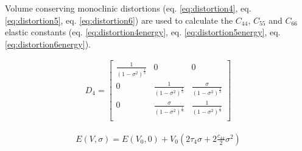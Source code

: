 Volume conserving monoclinic distortions (eq. \ref{eq:distortion4}, eq. \ref{eq:distortion5}, eq. \ref{eq:distortion6}) are used to calculate the $C_{44}$, $C_{55}$ and $C_{66}$ elastic constants (eq. \ref{eq:distortion4energy}, eq. \ref{eq:distortion5energy}, eq. \ref{eq:distortion6energy}).



\begin{center}
\begin{minipage}{.35\textwidth}
  \begin{equation}
    \begin{split}
      D_{4} = 
      \begin{bmatrix}
      \frac{1}{(1-\sigma^2)^{\frac{1}{3}}} & 0           & 0             \\
      0                                    & \frac{1}{(1-\sigma^2)^{\frac{1}{3}}}      & \frac{\sigma}{(1-\sigma^2)^{\frac{1}{3}}}  \\
      0                                    & \frac{\sigma}{(1-\sigma^2)^{\frac{1}{3}}} & \frac{1}{(1-\sigma^2)^{\frac{1}{3}}}       \\
      \end{bmatrix}
    \end{split}
  \label{eq:distortion4}
  \end{equation}
\end{minipage}
\begin{minipage}{.10\textwidth}
\end{minipage}
\begin{minipage}{.54\textwidth}
  \begin{equation}
    \begin{split}
    E(V,\sigma) = E(V_{0},0) + V_{0} \left(2 \tau_{4} \sigma + 2 \frac{c_{44}}{2} \sigma^2 \right)
    \end{split}
  \label{eq:distortion4energy}
  \end{equation}
\end{minipage}
\end{center}


